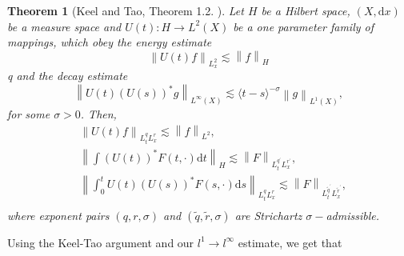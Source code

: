 \documentclass[12pt]{amsart}
\newtheorem{theorem}{Theorem}[section]
\newtheorem{remark}{Remark}
\newcommand\JP[1]{\langle#1\rangle}
\newcommand\norm[1]{\left\|#1\right\|}
\def\d{\mathrm{d}}
\begin{document}
	\begin{theorem}[Keel and Tao, Theorem 1.2. \cite{KT98} ]\label{thm:KT}
		Let $H$ be a Hilbert space, $\left(X,\d x\right)$ be a measure space and $U\left(t\right):H\to L^{2}\left(X\right)$ be a one parameter family of mappings, which obey the energy estimate
		\begin{equation*}
			\norm{U\left(t\right)f}_{L^{2}_{x}}\lesssim \norm{f}_{H}
		\end{equation*}q
		and the decay estimate
		\begin{equation*}
			\norm{U\left(t\right)\left(U\left(s\right)\right)^{*}g}_{L^{\infty}\left(X\right)}\lesssim\JP{t-s}^{-\sigma}\norm{g}_{L^{1}\left(X\right)},
		\end{equation*}
		for some $\sigma>0$. Then,
		\begin{equation*}
			\begin{aligned}
				&\norm{U\left(t\right)f}_{L_{t}^{q}L_{x}^{r}}\lesssim\norm{f}_{L^{2}},\\
				&\norm{\int\left(U\left(t\right)\right)^{*}F\left(t,\cdot\right)\d t}_{H}\lesssim \norm{F}_{L^{q^{\prime}}_{t}L^{r^{\prime}}_{x}},\\
				&\norm{\int^{t}_{0}U\left(t\right)\left(U\left(s\right)\right)^{*}F\left(s,\cdot\right)\d s}_{L^{q}_{t}L^{r}_{x}}\lesssim\norm{F}_{L^{\tilde{q}^{\prime}}_{t}L^{\tilde{r}^{\prime}}_{x}},\\
			\end{aligned}
		\end{equation*}
		where exponent pairs $\left(q,r,\sigma\right)$ and $\left(\tilde{q},\tilde{r},\sigma\right)$ are Strichartz $\sigma-$admissible.
	\end{theorem}
	Using the Keel-Tao argument and our $l^{1}\to l^{\infty}$ estimate, we get that
	
\end{document}

